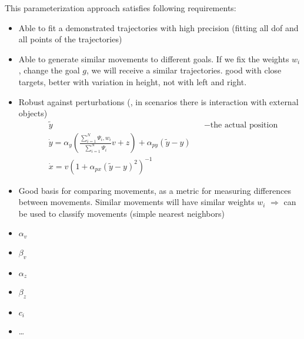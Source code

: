 This parameterization approach satisfies following requirements: 
\begin{itemize}
	\item Able to fit a demonstrated trajectories with high precision (fitting all \ac{dof} and all points of the trajectories)
	\item Able to generate similar movements to different goals. If we fix the weights $w_i$, change the goal $g$, we will receive a similar trajectories. \note good with close targets, better with variation in height, not with left and right.
	\item Robust against perturbations (\eg, in scenarios there is interaction with external objects)
	\begin{align}
		&\tilde{y} &&-\text{the actual position}\\
		&\dot{y} = \alpha_y \left( \frac{\sum_{i=1}^N \Psi_i, w_i}{\sum_{i=1}^N \Psi_i} v + z \right) + \alpha_{py} (\tilde{y} - y)\\
		&\dot{x} = v \left( 1+ \alpha_{px}(\tilde{y}-y)^2 \right) ^{-1}
	\end{align}
	\item Good basis for comparing movements, as a metric for measuring differences between movements. Similar movements will have similar weights $w_i$ $\Rightarrow$ can be used to classify movements (simple nearest neighbors)
\end{itemize}

\begin{itemize}
	\item $\alpha_v$
	\item $\beta_v$
	\item $\alpha_z$
	\item $\beta_z$
	\item $c_i$
	\item \dots
\end{itemize}